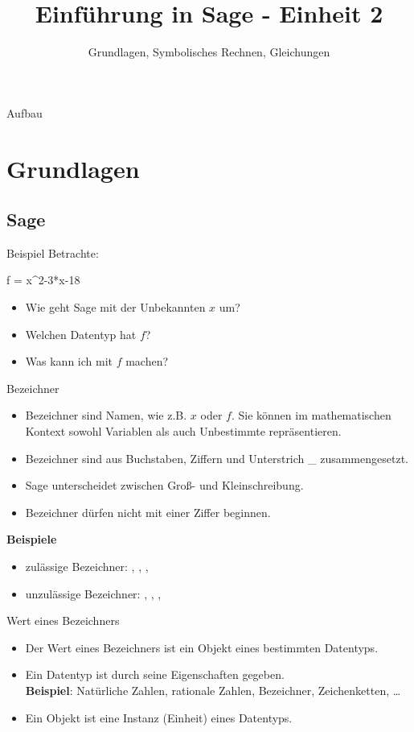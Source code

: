 \documentclass[hyperref={xetex}]{beamer}
\title{Einführung in Sage - Einheit 2}
\subtitle{Grundlagen, Symbolisches Rechnen, Gleichungen}
\begin{document}
\titlepage

\begin{frame}{Aufbau}
\tableofcontents
\end{frame}

\section{Grundlagen}

\subsection{Sage}

\begin{frame}[fragile]{Beispiel} 
Betrachte:
\begin{sagein}
f = x^2-3*x-18
\end{sagein}
\begin{itemize}
\item Wie geht Sage mit der Unbekannten $x$ um?
\item Welchen Datentyp hat $f$?
\item Was kann ich mit $f$ machen?
\end{itemize}
\end{frame}

\begin{frame}[fragile]{Bezeichner}
\begin{itemize}
\item \alert{Bezeichner} sind Namen, wie z.B. $x$ oder $f$. Sie können
im mathematischen Kontext sowohl Variablen als auch Unbestimmte repräsentieren.
\item Bezeichner sind aus Buchstaben, Ziffern und
Unterstrich \_ zusammengesetzt.
\item Sage unterscheidet zwischen Groß- und Kleinschreibung.
\item Bezeichner dürfen nicht mit einer Ziffer beginnen.
\end{itemize}
\textbf{Beispiele}
\begin{itemize}
\item zulässige Bezeichner:
, , , 
\item unzulässige Bezeichner:
, , , 
\end{itemize}
\end{frame}


\begin{frame}[fragile]{Wert eines Bezeichners}
\begin{itemize}
\item Der \alert{Wert} eines Bezeichners  ist ein \alert{Objekt} eines bestimmten
\alert{Datentyps}.
\item Ein \alert{Datentyp} ist durch seine Eigenschaften gegeben. \\
\textbf{Beispiel}: Natürliche Zahlen, rationale Zahlen, Bezeichner, Zeichenketten, \ldots  
\item Ein \alert{Objekt} ist eine Instanz (Einheit) eines Datentyps.
\end{itemize}
\end{frame}
\end{document}
